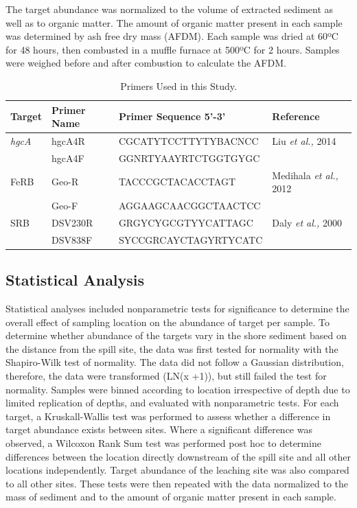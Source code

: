 \documentclass[ms, hidelinks]{uncgdissertationexp}
\theoremstyle{plain}
\theoremstyle{definition}
\theoremstyle{remark}
\begin{document}
The target abundance was normalized to the volume of extracted sediment as well as to organic matter. The amount of organic matter present in each sample was determined by ash free dry mass (AFDM). Each sample was dried at 60ºC for 48 hours, then combusted in a muffle furnace at 500ºC for 2 hours. Samples were weighed before and after combustion to calculate the AFDM.
\begin{table}[htbp]

\caption{\label{tab:primers}Primers Used in this Study.}
\centering
\begin{tabular}{llll}
\toprule
Target & Primer Name & Primer Sequence 5’-3’ & Reference\\
\midrule
\em{hgcA} & hgcA4R & CGCATYTCCTTYTYBACNCC & Liu \emph{et al.,} 2014\\
 & hgcA4F & GGNRTYAAYRTCTGGTGYGC & \\
FeRB & Geo-R & TACCCGCTACACCTAGT & Medihala \emph{et al.,} 2012\\
 & Geo-F & AGGAAGCAACGGCTAACTCC & \\
SRB & DSV230R & GRGYCYGCGTYYCATTAGC & Daly \emph{et al.,} 2000\\
 & DSV838F & SYCCGRCAYCTAGYRTYCATC & \\
\bottomrule
\end{tabular}
\end{table}
\hypertarget{statistical-analysis}{%
\subsection{Statistical Analysis}\label{statistical-analysis}}

Statistical analyses included nonparametric tests for significance to determine the overall effect of sampling location on the abundance of target per sample. To determine whether abundance of the targets vary in the shore sediment based on the distance from the spill site, the data was first tested for normality with the Shapiro-Wilk test of normality. The data did not follow a Gaussian distribution, therefore, the data were transformed (LN(x +1)), but still failed the test for normality. Samples were binned according to location irrespective of depth due to limited replication of depths, and evaluated with nonparametric tests. For each target, a Kruskall-Wallis test was performed to assess whether a difference in target abundance exists between sites. Where a significant difference was observed, a Wilcoxon Rank Sum test was performed post hoc to determine differences between the location directly downstream of the spill site and all other locations independently. Target abundance of the leaching site was also compared to all other sites. These tests were then repeated with the data normalized to the mass of sediment and to the amount of organic matter present in each sample.
\end{document}
